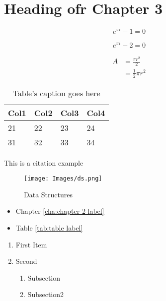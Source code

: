 \chapter{ Heading ofr Chapter 3} %
\label{cha:chapter 3 label} %
\begin{equation}
    \label{eu_eqn}
    e^{\pi i } +1 =0
\end{equation}

\begin{equation}
    \label{eu_eqn}
    e^{\pi i } +2 =0
\end{equation}

\begin{equation} \label{eq1}
\begin{split}
A & = \frac{\pi r^2}{2} \\
 & = \frac{1}{2} \pi r^2
\end{split}
\end{equation}

\begin{table}
\centering
\caption{Table's caption goes here}
\begin{tabular}{|l|l|l|l|} 
\hline
Col1 & Col2 & Col3 & Col4  \\ 
\hline
21   & 22   & 23   & 24    \\ 
\hline
31   & 32   & 33   & 34    \\
\hline
\end{tabular}
\end{table}

This is a citation example \cite{rusk2016deep}

\begin{figure}
    \centering
    \texttt{[image: Images/ds.png]}
    \caption{Data Structures}
    \label{fig:ds}
\end{figure}

\begin{itemize}
    \item Chapter \ref{cha:chapter 2 label}
    \item Table \ref{tab:table label}
\end{itemize}

\begin{enumerate}
    \item First Item
    \item Second
    \begin{enumerate}
        \item Subsection
        \item Subsection2 
    \end{enumerate}
\end{enumerate}

\blindtext[2]